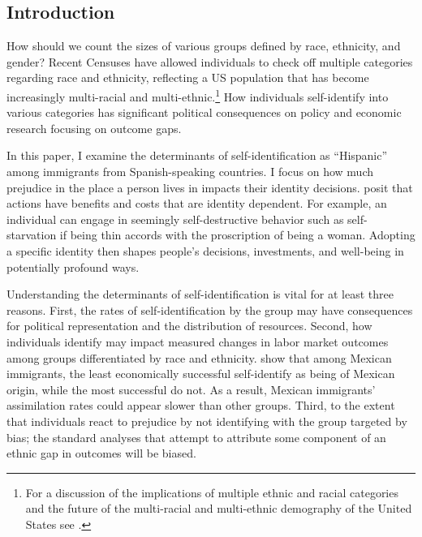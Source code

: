 \documentclass[12pt, fullpage]{article}
\begin{document}
\subsection{Introduction}\label{sec:intro}
 
How should we count the sizes of various groups defined by race, ethnicity, and gender? Recent Censuses have allowed individuals to check off multiple categories regarding race and ethnicity, reflecting a US population that has become increasingly multi-racial and multi-ethnic.\footnote{For a discussion of the implications of multiple ethnic and racial categories and the future of the multi-racial and multi-ethnic demography of the United States see \citet{bratterMultiracialIdentificationRacial2018,albaGreatDemographicIllusion2020}.} How individuals self-identify into various categories has significant political consequences on policy and economic research focusing on outcome gaps.

In this paper, I examine the determinants of self-identification as ``Hispanic'' among immigrants from Spanish-speaking countries. I focus on how much prejudice in the place a person lives in impacts their identity decisions.  \citet{akerlofEconomicsIdentity2000} posit that actions have benefits and costs that are identity dependent. For example, an individual can engage in seemingly self-destructive behavior such as self-starvation if being thin accords with the proscription of being a woman. Adopting a specific identity then shapes people's decisions, investments, and well-being in potentially profound ways. 

Understanding the determinants of self-identification is vital for at least three reasons. First, the rates of self-identification by the group may have consequences for political representation and the distribution of resources. Second, how individuals identify may impact measured changes in labor market outcomes among groups differentiated by race and ethnicity.  \citet{antmanEthnicAttritionObserved2016} show that among Mexican immigrants, the least economically successful self-identify as being of Mexican origin, while the most successful do not. As a result, Mexican immigrants' assimilation rates could appear slower than other groups. Third, to the extent that individuals react to prejudice by not identifying with the group targeted by bias; the standard analyses that attempt to attribute some component of an ethnic gap in outcomes will be biased.
\end{document}
